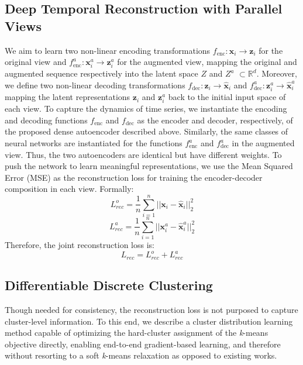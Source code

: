 \documentclass[times, review, 10pt]{elsarticle}
\begin{document}
\subsection{Deep Temporal Reconstruction with Parallel Views}
 We aim to learn two non-linear encoding transformations $f_{\text{enc}}: \mathbf{x}_i \rightarrow \mathbf{z}_i $ for the original view and $f_{\text{enc}}^a: \mathbf{x}_i^a \rightarrow \mathbf{z}_i^a $ for the augmented view, mapping the original and augmented sequence respectively into the latent space $\textit{Z}$ and $\textit{Z}^a$ $\subset \mathbb{R}^d$. Moreover, we define two non-linear decoding transformations $f_{\text{dec}}: \mathbf{z}_i \rightarrow \mathbf{\hat{x}}_i $ and $f_{\text{dec}}^a: \mathbf{z}_i^a \rightarrow \mathbf{\hat{x}}_i^a $ mapping the latent representations $\mathbf{z}_i$ and $\mathbf{z}_i^a$ back to the initial input space of each view. To capture the dynamics of time series, we instantiate the encoding and decoding functions $f_{\text{enc}}$ and  $f_{\text{dec}}$ as the encoder and decoder, respectively, of the proposed dense autoencoder described above. Similarly, the same classes of neural networks are instantiated for the functions $f_{\text{enc}}^a$ and $f_{\text{dec}}^a$ in the augmented view. Thus, the two autoencoders are identical but have different weights. To push the network to learn meaningful representations, we use the Mean Squared Error (MSE) as the reconstruction loss for training the encoder-decoder composition in each view. Formally:
%
\begin{equation}
    L_{rec}^o = \frac{1}{n} \sum_{i=1}^n \lvert\lvert \mathbf{x}_i - \mathbf{\hat{x}}_i \rvert\rvert_2^2
\end{equation}
%
\begin{equation}
    L_{rec}^a = \frac{1}{n} \sum_{i=1}^n \lvert\lvert \mathbf{x}_i^a - \mathbf{\hat{x}}_i^a \rvert\rvert_2^2
\end{equation}
%
Therefore, the joint reconstruction loss is:
%
\begin{equation}
    L_{rec} = L_{rec}^o + L_{rec}^a
\end{equation}

\subsection{Differentiable Discrete Clustering}
Though needed for consistency, the reconstruction loss is not purposed to capture cluster-level information. To this end, we describe a cluster distribution learning method capable of optimizing the hard-cluster assignment of the \textit{k}-means objective directly, enabling end-to-end gradient-based learning, and therefore without resorting to a soft \textit{k}-means relaxation as opposed to existing works.
\end{document}
